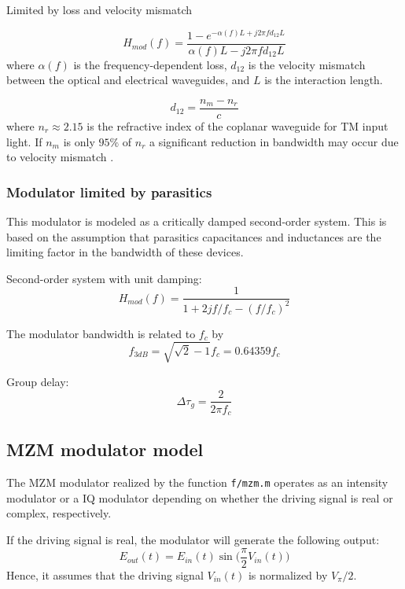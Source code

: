\documentclass[a4paper]{article}
\begin{document}
Limited by loss and velocity mismatch

\begin{equation}
H_{mod}(f) = \frac{1-e^{-\alpha(f)L+j2\pi fd_{12}L}}{\alpha(f)L-j2\pi fd_{12}L}
\end{equation}
where $\alpha(f)$ is the frequency-dependent loss, $d_{12}$ is the velocity mismatch between the optical and electrical waveguides, and $L$ is the interaction length.

\begin{equation}
d_{12} = \frac{n_m-n_r}{c}
\end{equation}
where $n_r \approx 2.15$ is the refractive index of the coplanar waveguide for TM input light. If $n_m$ is only $95\%$ of $n_r$ a significant reduction in bandwidth may occur due to velocity mismatch \cite{Ho2005}.

\subsubsection{Modulator limited by parasitics}
This modulator is modeled as a critically damped second-order system. This is based on the assumption that parasitics capacitances and inductances are the limiting factor in the bandwidth of these devices.

Second-order system with unit damping:
\begin{equation}
H_{mod}(f) =  \frac{1}{1 + 2jf/f_c - (f/f_c)^2}
\end{equation}

The modulator bandwidth is related to $f_c$ by
\begin{equation}
f_{3dB} = \sqrt{\sqrt{2}-1}f_c = 0.64359f_c
\end{equation}

Group delay:
\begin{equation}
\Delta\tau_g = \frac{2}{2\pi f_c}
\end{equation}

\subsection{MZM modulator model}

The MZM modulator realized by the function \texttt{f/mzm.m} operates as an intensity modulator or a IQ modulator depending on whether the driving signal is real or complex, respectively. 

If the driving signal is real, the modulator will generate the following output:
\begin{equation}
E_{out}(t) = E_{in}(t)\sin\Big(\frac{\pi}{2}V_{in}(t)\Big)
\end{equation}
Hence, it assumes that the driving signal $V_{in}(t)$ is normalized by $V_{\pi}/2$.
\end{document}
